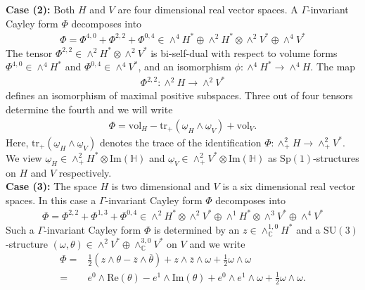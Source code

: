 \documentclass[psamsfonts]{amsart}
\theoremstyle{plain}
\theoremstyle{definition}{
\newtheorem{defi}{Definition}[section]
\newtheorem{ass}{Assumption}
\newtheorem*{nota}{Notation}}
\theoremstyle{remark}{
\newtheorem{rem}{Remark}
\newtheorem{ex}{Example}}
\theoremstyle{plain}{
\newtheorem{thm}{Theorem}[section]
\newtheorem{lem}{Lemma}[section]
\newtheorem{cor}{Corollary}[section]
\newtheorem{prop}{Proposition}[section]
\newtheorem{con}{Conjecture}[section]}
\newcommand{\m}[1]{{\mathrm{#1}}}
\begin{document}
\textbf{Case (2): }Both $H$ and $V$ are four dimensional real vector spaces. A $\Gamma$-invariant Cayley form $\Phi$ decomposes into 
\begin{align*}
    \Phi=\Phi^{4,0}+\Phi^{2,2}+\Phi^{0,4}\in\wedge^4 H^*\oplus\wedge^2 H^*\otimes\wedge^2V^*\oplus\wedge^4V^*
\end{align*}
The tensor $\Phi^{2,2}\in\wedge^2H^*\otimes\wedge^2 V^*$ is bi-self-dual with respect to volume forms $\Phi^{4,0}\in\wedge^4 H^*$ and $\Phi^{0,4}\in\wedge^4 V^*$, and an isomorphism $\phi \colon\wedge^4 H^*\rightarrow\wedge^4 H$. The map 
\begin{align*}
    \Phi^{2,2} \colon\wedge^2H\rightarrow\wedge^2 V^*
\end{align*}
defines an isomorphism of maximal positive subspaces. Three out of four tensors determine the fourth and we will write
\begin{align*}
    \Phi=\m{vol}_H-\m{tr}_+(\underline{\omega}_H\wedge\underline{\omega}_V)+\m{vol}_V.
\end{align*}
Here, $\m{tr}_+(\underline{\omega}_H\wedge\underline{\omega}_V)$ denotes the trace of the identification $\Phi\colon \wedge^2_+ H\rightarrow \wedge^2_+ V^*$. We view $\underline{\omega}_H\in \wedge^2_+ H^*\otimes\m{Im}(\mathbb{H})$ and $\underline{\omega}_V\in \wedge^2_+ V^*\otimes\m{Im}(\mathbb{H})$ as $\m{Sp}(1)$-structures on $H$ and $V$ respectively.\\



\textbf{Case (3): } The space $H$ is two dimensional and $V$ is a six dimensional real vector spaces. In this case a $\Gamma$-invariant Cayley form $\Phi$ decomposes into 
\begin{align*}
    \Phi=\Phi^{2,2}+\Phi^{1,3}+\Phi^{0,4}\in\wedge^2 H^*\otimes\wedge^2V^*\oplus\wedge^1 H^*\otimes\wedge^3V^*\oplus\wedge^4V^*
\end{align*}
Such a $\Gamma$-invariant Cayley form $\Phi$ is determined by an $z\in\wedge^{1,0}_{\mathbb{C}}H^* $ and a $\m{SU}(3)$-structure $(\omega,\theta)\in \wedge^2 V^*\oplus \wedge^{3,0}_{\mathbb{C}}V^*$ on $V$ and we write 
\begin{align*}
    \Phi=&\tfrac{1}{2}(z\wedge\theta-\overline{z}\wedge\overline{\theta})+z\wedge\overline{z}\wedge\omega+\tfrac{1}{2}\omega\wedge\omega\\
    =&e^0\wedge\m{Re}(\theta)-e^1\wedge\m{Im}(\theta)+e^0\wedge e^1\wedge\omega+\tfrac{1}{2}\omega\wedge\omega.
\end{align*}
 
\end{document}
